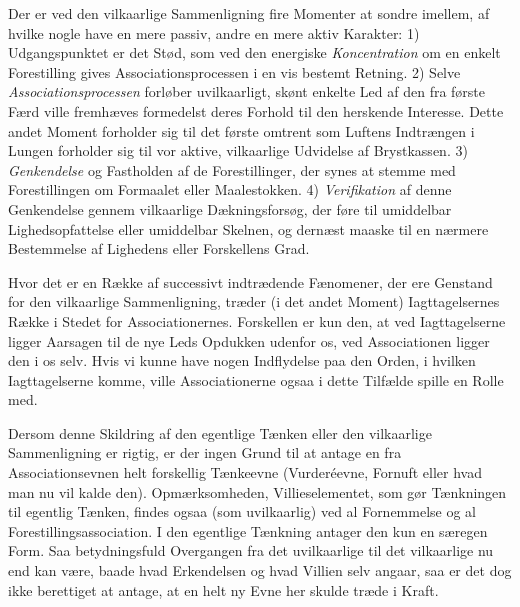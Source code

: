 \documentclass[12pt,a4paper,openany]{book}
\newcommand{\opage}[1]{\marginnote{\footnotesize\textit{[#1]}}}
\begin{document}
Der er ved den vilkaarlige Sammenligning fire Momenter at sondre imellem, af
hvilke nogle have en mere passiv, andre en mere aktiv Karakter: 1)
Udgangspunktet er det Stød, som ved den energiske \emph{Koncentration} om en
enkelt Forestilling gives Associationsprocessen i en vis bestemt Retning. 2)
Selve \emph{Associationsprocessen} forløber uvilkaarligt, skønt enkelte Led af
den fra første Færd ville fremhæves formedelst deres Forhold til den herskende
Interesse. Dette andet Moment forholder sig til det første omtrent som Luftens
Indtrængen i Lungen forholder sig til vor aktive, vilkaarlige Udvidelse af
Brystkassen. 3) \emph{Genkendelse} og Fastholden af de Forestillinger, der
synes at stemme med Forestillingen om Formaalet eller Maalestokken. 4)
\emph{Verifikation} af denne Genkendelse gennem vilkaarlige Dækningsforsøg, der
føre til umiddelbar Lighedsopfattelse eller umiddelbar Skelnen, og dernæst
maaske til en nærmere Bestemmelse af Lighedens eller Forskellens Grad.

Hvor det er en Række af successivt indtrædende Fænomener, der ere Genstand for
den vilkaarlige Sammenligning, træder (i det andet Moment) Iagttagelsernes
Række i Stedet for Associationernes. Forskellen er kun den, at ved
Iagttagelserne ligger Aarsagen til de nye Leds Opdukken udenfor os, ved
Associationen ligger den i os selv. Hvis vi kunne have nogen Indflydelse paa
den Orden, i hvilken Iagttagelserne komme, ville Associationerne ogsaa i dette
Tilfælde spille en Rolle med.

Dersom denne Skildring af den egentlige Tænken eller den vilkaarlige
Sammenligning er rigtig, er der ingen Grund til at antage en fra
Associationsevnen helt forskellig Tænkeevne (Vurderéevne, Fornuft eller hvad
man nu vil kalde den). Opmærksomheden, Villieselementet, som gør Tænkningen til
egentlig Tænken, findes ogsaa (som uvilkaarlig) ved al Fornemmelse og al
Forestillingsassociation. I den egentlige Tænkning antager den
\setcounter{footnote}{0}%
\opage{67}kun en særegen Form. Saa betydningsfuld Overgangen fra det
uvilkaarlige til det vilkaarlige nu end kan være, baade hvad Erkendelsen og
hvad Villien selv angaar, saa er det dog ikke berettiget at antage, at en helt
ny Evne her skulde træde i Kraft.
\end{document}

